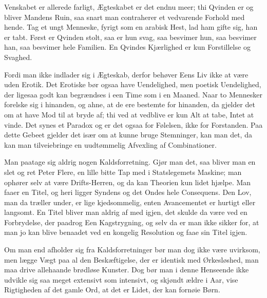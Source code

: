 \documentclass[12pt,a4paper]{article}
\begin{document}
Venskabet er allerede farligt, Ægteskabet er det endnu meer; thi Qvinden er og bliver Mandens Ruin, saa snart man contraherer et vedvarende Forhold med hende. Tag et ungt Menneske, fyrigt som en arabisk Hest, lad ham gifte sig, han er tabt. Først er Qvinden stolt, saa er hun svag, saa besvimer hun, saa besvimer han, saa besvimer hele Familien. En Qvindes Kjærlighed er kun Forstillelse og Svaghed.

Fordi man ikke indlader sig i Ægteskab, derfor behøver Eens Liv ikke at være uden Erotik. Det Erotiske bør ogsaa have Uendelighed, men poetisk Uendelighed, der ligesaa godt kan begrændses i een Time som i en Maaned. Naar to Mennesker forelske sig i hinanden, og ahne, at de ere bestemte for hinanden, da gjelder det om at have Mod til at bryde af; thi ved at vedblive er kun Alt at tabe, Intet at vinde. Det synes et Paradox og er det ogsaa for Følelsen, ikke for Forstanden. Paa dette Gebeet gjelder det især om at kunne bruge Stemninger, kan man det, da kan man tilveiebringe en uudtømmelig Afvexling af Combinationer.

Man paatage sig aldrig nogen Kaldsforretning. Gjør man det, saa bliver man en slet og ret Peter Flere, en lille bitte Tap med i Statslegemets Maskine; man ophører selv at være Drifts-Herren, og da kan Theorien kun lidet hjælpe. Man faaer en Titel, og heri ligger Syndens og det Ondes hele Consequens. Den Lov, man da træller under, er lige kjedsommelig, enten Avancementet er hurtigt eller langsomt. En Titel bliver man aldrig af med igjen, det skulde da være ved en Forbrydelse, der paadrog Een Kagstrygning, og selv da er man ikke sikker for, at man jo kan blive benaadet ved en kongelig Resolution og faae sin Titel igjen.

Om man end afholder sig fra Kaldsforretninger bør man dog ikke være uvirksom, men lægge Vægt paa al den Beskæftigelse, der er identisk med Ørkesløshed, man maa drive allehaande brødløse Kunster. Dog bør man i denne Henseende ikke udvikle sig saa meget extensivt som intensivt, og skjøndt ældre i Aar, vise Rigtigheden af det gamle Ord, at det er Lidet, der kan fornøie Børn.
\end{document}
